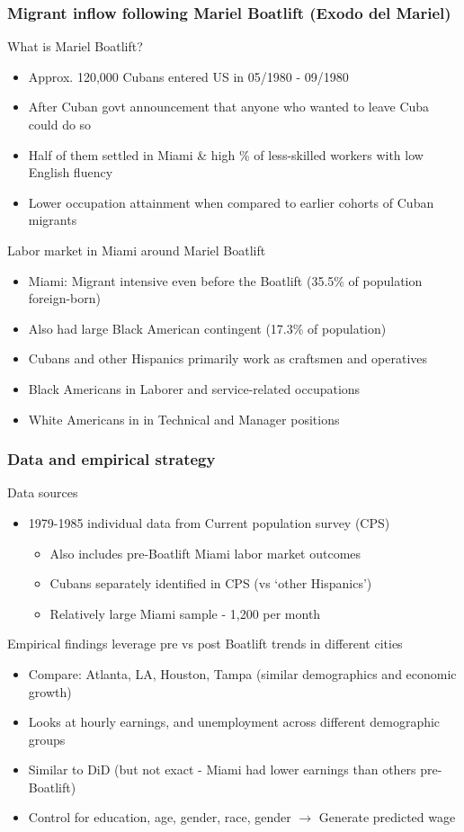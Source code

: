 \documentclass[aspectratio=169]{beamer}
\begin{document}
\begin{frame}
\frametitle{Migrant inflow following Mariel Boatlift (Exodo del Mariel)} 
What is Mariel Boatlift?
\begin{itemize}\setlength\itemsep{3pt}
\item Approx. 120,000 Cubans entered US in 05/1980 - 09/1980
\item After Cuban govt announcement that anyone who wanted to leave Cuba could do so
\item Half of them settled in Miami \& high \% of less-skilled workers with low English fluency
\item Lower occupation attainment when compared to earlier cohorts of Cuban migrants
\end{itemize}\medskip
Labor market in Miami around Mariel Boatlift
\begin{itemize}\setlength\itemsep{3pt}
\item Miami: Migrant intensive even before the Boatlift (35.5\% of population foreign-born)
\item Also had large Black American contingent (17.3\% of population)
\item Cubans and other Hispanics primarily work as craftsmen and operatives
\item Black Americans in Laborer and service-related occupations 
\item White Americans in in Technical and Manager positions 
\end{itemize}\medskip
\end{frame}

\begin{frame}
\frametitle{Data and empirical strategy} 
Data sources
\begin{itemize}\setlength\itemsep{3pt}
\item 1979-1985 individual data from Current population survey (CPS) 
\begin{itemize}\setlength\itemsep{3pt}
  \item Also includes pre-Boatlift Miami labor market outcomes
  \item Cubans separately identified in CPS (vs `other Hispanics')
  \item Relatively large Miami sample - 1,200 per month
  \end{itemize}
\end{itemize}\medskip
Empirical findings leverage pre vs post Boatlift trends in different cities
\begin{itemize}\setlength\itemsep{3pt}
\item Compare: Atlanta, LA, Houston, Tampa (similar demographics and economic growth)
\item Looks at hourly earnings, and unemployment across different demographic groups
\item Similar to DiD (but not exact - Miami had lower earnings than others pre-Boatlift)
\item Control for education, age, gender, race, gender $\to$ Generate predicted wage
\end{itemize}\medskip
\end{frame}
\end{document}
